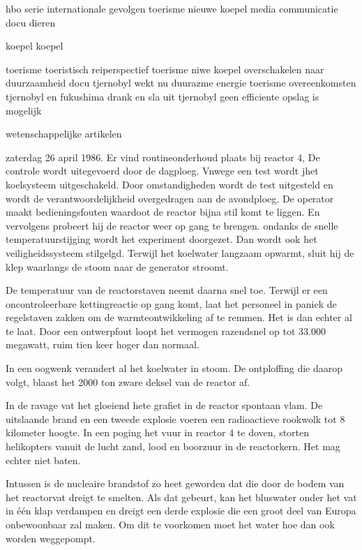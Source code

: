 \cite{deVriestjernobylHolland}
hbo serie
internationale gevolgen
toerisme
nieuwe koepel
media communicatie
docu
dieren

\cite{}
koepel
koepel

\cite{ing3enieur29042015antistralingskoepel}
toerisme
toeristisch reiperspectief
toerisme
niwe koepel
overschakelen naar duurzaamheid
docu
tjernobyl wekt nu duurazme energie
toerisme
overeenkomsten tjernobyl en fukushima
drank en sla uit tjernobyl
geen efficiente opslag is mogelijk

wetenschappelijke artikelen

zaterdag 26 april 1986. Er vind routineonderhoud plaats bij reactor 4, De controle wordt uitegevoerd door de dagploeg. Vnwege een test wordt jhet koelsysteem uitgeschakeld. Door omstandigheden wordt de test uitgesteld en wordt de verantwoordelijkheid overgedragen aan de avondploeg.
De operator maakt bedieningsfouten waardoot de reactor bijna stil komt te liggen. En vervolgens probeert hij de reactor weer op gang te brengen. ondanks de snelle temperatuurstijging wordt het experiment doorgezet. Dan wordt ook het veiligheidssysteem stilgelgd. Terwijl het koelwater langzaam opwarmt, sluit hij de klep waarlangs de stoom naar de generator stroomt.

De temperatuur van de reactorstaven neemt daarna snel toe. Terwijl er een oncontroleerbare kettingreactie op gang komt, laat het personeel in paniek de regelstaven zakken om de warmteontwikkeling af te remmen. Het is dan echter al te laat. Door een ontwerpfout loopt het vermogen razendsnel op tot 33.000 megawatt, ruim tien keer hoger dan normaal.

In een oogwenk verandert al het koelwater in stoom. De ontploffing die daarop volgt, blaast het 2000 ton zware deksel van de reactor af.

In de ravage vat het gloeiend hete grafiet in de reactor spontaan vlam. De uitslaande brand en een tweede explosie voeren een radioactieve rookwolk tot 8 kilometer hoogte. 
In een poging het vuur in reactor 4 te doven, storten helikopters vanuit de lucht zand, lood en boorzuur in de reactorkern. Het mag echter niet baten.

Intussen is de nucleaire brandstof zo heet geworden dat die door de bodem van het reactorvat dreigt te smelten. Als dat gebeurt, kan het bluswater onder het vat in één klap verdampen en dreigt een derde explosie die een groot deel van Europa onbewoonbaar zal maken. Om dit te voorkomen moet het water hoe dan ook worden weggepompt.

